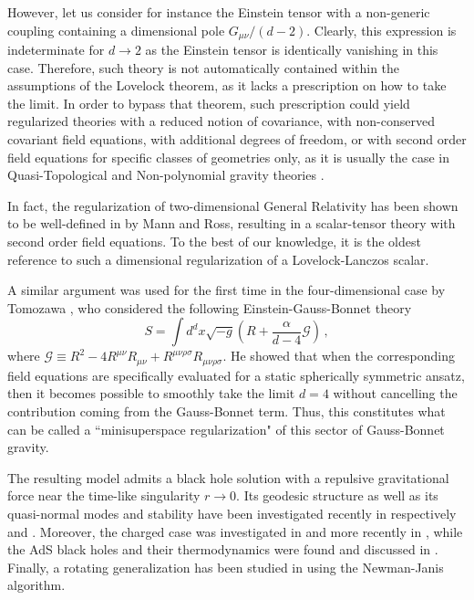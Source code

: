 \documentclass[aps,prd,preprint,nofootinbib]{revtex4-1}
\begin{document}
However, let us consider for instance the Einstein tensor with a non-generic coupling containing a dimensional pole $G_{\mu\nu}/(d-2)$. Clearly, this expression is indeterminate for $d\to 2$ as the Einstein tensor is identically vanishing in this case. Therefore, such theory is not automatically contained within the assumptions of the Lovelock theorem, as it lacks a prescription on how to take the limit. In order to bypass that theorem, such prescription could yield regularized theories with a reduced notion of covariance, with non-conserved covariant field equations, with additional degrees of freedom, or with second order field equations for specific classes of geometries only, as it is usually the case in Quasi-Topological \cite{Quasi-Top1, Quasi-Top2} and Non-polynomial gravity theories \cite{Deser, LorenzoSergio, aim}.  

 In fact, the regularization of two-dimensional General Relativity has been shown to be well-defined in \cite{GRD=2} by Mann and Ross, resulting in a scalar-tensor theory with second order field equations. To the best of our knowledge, it is the oldest reference to such a dimensional regularization of a Lovelock-Lanczos scalar. 

A similar argument was used for the first time in the four-dimensional case by Tomozawa \cite{Tomozawa:2011gp}, who considered the following Einstein-Gauss-Bonnet theory
\begin{equation}
S = \int d^d x \sqrt{-g} \left( R + \frac{\alpha}{d-4} \mathcal{G} \right)\,,
\end{equation}
where $\mathcal{G} \equiv R^2 - 4 R^{\mu \nu} R_{\mu \nu} + R^{\mu \nu \rho \sigma} R_{\mu \nu \rho \sigma}$. He showed that when the corresponding field equations are specifically evaluated for a static spherically symmetric ansatz, then it becomes possible to smoothly take the limit $d=4$ without cancelling the contribution coming from the Gauss-Bonnet term. Thus, this constitutes what can be called a ``minisuperspace regularization" of this sector of Gauss-Bonnet gravity. 

The resulting model admits a black hole solution with a repulsive gravitational force near the time-like singularity $r\to 0$. Its geodesic structure as well as its quasi-normal modes and stability have been investigated recently in respectively \cite{geodesics} and \cite{QNM}. Moreover, the charged case was investigated in \cite{conformal} and more recently in \cite{charged}, while the AdS black holes and their thermodynamics were found and discussed in \cite{ConfThermo, thermod}. Finally, a rotating generalization has been studied in \cite{Rotating,Rotating2} using the Newman-Janis algorithm.
\end{document}
